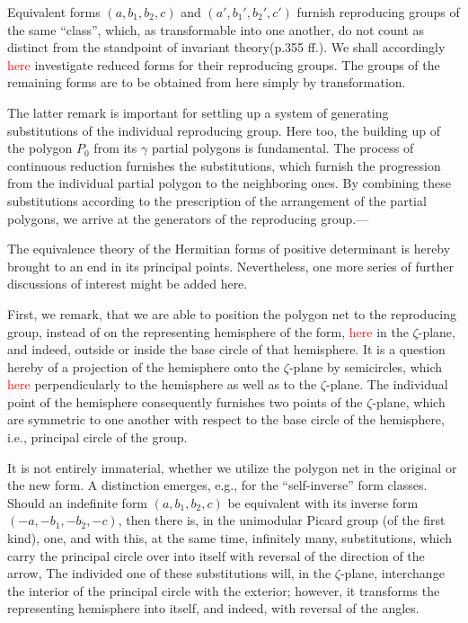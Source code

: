 Equivalent forms $(a,b_1,b_2,c)$ and $(a',b_1',b_2',c')$ furnish reproducing groups of the same “class”, which, as transformable into one another, do not count as distinct from the standpoint of invariant theory(p.355 ff.). We shall accordingly \textcolor{red}{here} investigate reduced forms for their reproducing groups. The groups of the remaining forms are to be obtained from here simply by transformation.

The latter remark is important for settling up a system of generating substitutions of the individual reproducing group. Here too, the building up of the polygon $P_0$ from its $\gamma$ partial polygons is fundamental. The process of continuous reduction furnishes the substitutions, which furnish the progression from the individual partial polygon to the neighboring ones. By combining these substitutions according to the prescription of the arrangement of the partial polygons, we arrive at the generators of the reproducing group.---

The equivalence theory of the Hermitian forms of positive determinant is hereby brought to an end in its principal points. Nevertheless, one more series of further discussions of interest might be added here.

First, we remark, that we are able to position the polygon net to the reproducing group, instead of on the representing hemisphere of the form, \textcolor{red}{here} in the $\zeta$-plane, and indeed, outside or inside the base circle of that hemisphere. It is a question hereby of a projection of the hemisphere onto the $\zeta$-plane by semicircles, which \textcolor{red}{here} perpendicularly to the hemisphere as well as to the $\zeta$-plane. The individual point of the hemisphere consequently furnishes two points of the $\zeta$-plane, which are symmetric to one another with respect to the base circle of the hemisphere, i.e., principal circle of the group.

It is not entirely immaterial, whether we utilize the polygon net in the original or the new form. A distinction emerges, e.g., for the “self-inverse” form classes. Should an indefinite form $(a,b_1,b_2,c)$ be equivalent with its inverse form $(-a,-b_1,-b_2,-c)$, then there is, in the unimodular Picard group (of the first kind), one, and with this, at the same time, infinitely many, substitutions, which carry the principal circle over into itself with reversal of the direction of the arrow, The individed one of these substitutions will, in the $\zeta$-plane, interchange the interior of the principal circle with the exterior; however, it transforms the representing hemisphere into itself, and indeed, with reversal of the angles.

